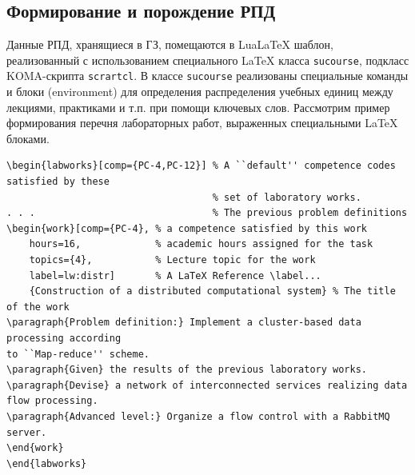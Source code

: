 \documentclass[
]{aiitart}
\providecommand{\LuaLaTeX}{Lua\LaTeX}
\begin{document}
\subsection{Формирование и порождение РПД}

Данные РПД, хранящиеся в ГЗ, помещаются в \LuaLaTeX{} шаблон, реализованный с использованием специального \LaTeX{} класса \verb|sucourse|, подкласс KOMA-скрипта \verb|scrartcl|.  В классе \verb|sucourse| реализованы специальные команды и блоки (environment) для определения распределения учебных единиц между лекциями, практиками и т.п. при помощи ключевых слов. Рассмотрим пример формирования перечня лабораторных работ, выраженных специальными \LaTeX{} блоками.

\begin{verbatim}
\begin{labworks}[comp={PC-4,PC-12}] % A ``default'' competence codes satisfied by these
                                    % set of laboratory works.
. . .                               % The previous problem definitions
\begin{work}[comp={PC-4}, % a competence satisfied by this work
    hours=16,             % academic hours assigned for the task
    topics={4},           % Lecture topic for the work
    label=lw:distr]       % A LaTeX Reference \label...
    {Construction of a distributed computational system} % The title of the work
\paragraph{Problem definition:} Implement a cluster-based data processing according
to ``Map-reduce'' scheme.
\paragraph{Given} the results of the previous laboratory works.
\paragraph{Devise} a network of interconnected services realizing data flow processing.
\paragraph{Advanced level:} Organize a flow control with a RabbitMQ server.
\end{work}
\end{labworks}
\end{verbatim}
\end{document}
